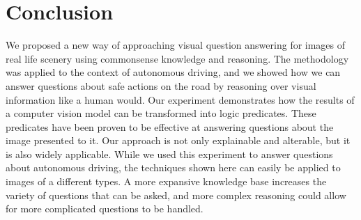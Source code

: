 \section{Conclusion}
We proposed a new way of approaching visual question answering for images of real life scenery using commonsense knowledge and reasoning. The methodology was applied to the context of autonomous driving, and we showed how we can answer questions about safe actions on the road by reasoning over visual information like a human would. Our experiment demonstrates how the results of a computer vision model can be transformed into logic predicates. These predicates have been proven to be effective at answering questions about the image presented to it. Our approach is not only explainable and alterable, but it is also widely applicable. While we used this experiment to answer questions about autonomous driving, the techniques shown here can easily be applied to images of a different types. A more expansive knowledge base increases the variety of questions that can be asked, and more complex reasoning could allow for more complicated questions to be handled. 